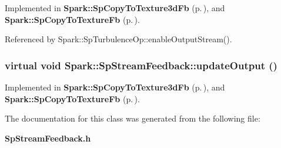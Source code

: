 Implemented in {\bf Spark::Sp\-Copy\-To\-Texture3d\-Fb} {\rm (p.\,\pageref{classSpark_1_1SpCopyToTexture3dFb_a2})}, and {\bf Spark::Sp\-Copy\-To\-Texture\-Fb} {\rm (p.\,\pageref{classSpark_1_1SpCopyToTextureFb_a2})}.



Referenced by Spark::Sp\-Turbulence\-Op::enable\-Output\-Stream().
\subsubsection{\setlength{\rightskip}{0pt plus 5cm}virtual void Spark::Sp\-Stream\-Feedback::update\-Output ()\hspace{0.3cm}{\tt  [pure virtual]}}\label{classSpark_1_1SpStreamFeedback_a1}




Implemented in {\bf Spark::Sp\-Copy\-To\-Texture3d\-Fb} {\rm (p.\,\pageref{classSpark_1_1SpCopyToTexture3dFb_a3})}, and {\bf Spark::Sp\-Copy\-To\-Texture\-Fb} {\rm (p.\,\pageref{classSpark_1_1SpCopyToTextureFb_a3})}.



The documentation for this class was generated from the following file:\begin{CompactItemize}
\item 
{\bf Sp\-Stream\-Feedback.h}\end{CompactItemize}

